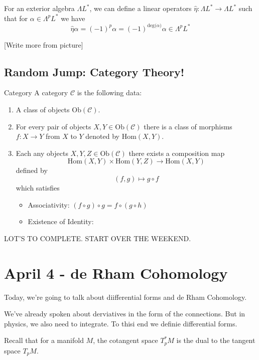 \documentclass{article}
\begin{document}
\vskip 1cm
For an exterior algebra $\Lambda L^*$, we can define a linear operators $\hat{\eta} : \Lambda L^* \rightarrow \Lambda L^*$ such that for $\alpha \in \Lambda^p L^*$ we have 
\[  \hat{\eta} \alpha = (-1)^p \alpha = (-1)^{\text{deg($\alpha$)}} \alpha \in \Lambda^p L^* \]

[Write more from picture]


\vskip 1cm
\subsection{Random Jump: Category Theory!}

\vskip 0.5cm
\begin{mathdefinitionbox}{Category}
  \vskip 0.25cm
  A category $\mathcal{C}$ is the following data:
  \begin{enumerate}
    \item A class of objects $\text{Ob}(\mathcal{C})$.
    \item For every pair of objects $X, Y \in \text{Ob}(\mathcal{C})$ there is a class of morphisms $f : X \rightarrow Y$ from $X$ to $Y$ denoted by $\text{Hom}(X, Y)$.
    \item Each any objects $X, Y, Z \in \text{Ob}(\mathcal{C})$ there exists a composition map 
    \[ \text{Hom}(X, Y) \times \text{Hom}(Y, Z) \rightarrow \text{Hom}(X, Y)  \]
    defined by 
    \[ (f, g) \mapsto g \circ f \]
    which satisfies 
    \begin{itemize}
      \item Associativity: $(f \circ g) \circ g = f \circ (g \circ h)$
      \item Existence of Identity: 
    \end{itemize}
  \end{enumerate}  
\end{mathdefinitionbox}

\pagebreak
LOT'S TO COMPLETE. START OVER THE WEEKEND.

\pagebreak
\section*{April 4 - de Rham Cohomology}

Today, we're going to talk about diifferential forms and de Rham Cohomology. 

\vskip 0.5cm
We've already spoken about derviatives in the form of the connections. But in physics, we also need to integrate. To thisi end we definie differential forms.

\vskip 0.5cm
Recall that for a manifold $M$, the cotangent space $T_p^* M $ is the dual to the tangent space $T_p M$.
\end{document}
